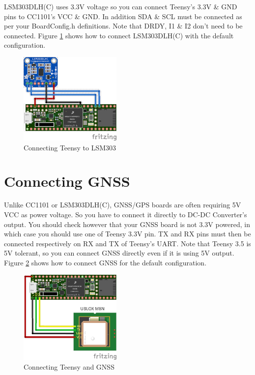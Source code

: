 \documentclass{report}
\begin{document}
LSM303DLH(C) uses 3.3V voltage so you can connect Teensy's 3.3V \& GND pins to CC1101's VCC \& GND. In addition SDA \& SCL must be connected as per your BoardConfig.h definitions. Note that DRDY, I1 \& I2 don't need to be connected. Figure \ref{figure:lsm303} shows how to connect LSM303DLH(C) with the default configuration.

\begin{figure}[h]
	\centering
	\includegraphics[width=50mm]{MicronetToNMEA_LSM303.png}
	\caption{Connecting Teensy to LSM303}
	\label{figure:lsm303}
\end{figure}

\section{Connecting GNSS}

Unlike CC1101 or LSM303DLH(C), GNSS/GPS boards are often requiring 5V VCC as power voltage. So you have to connect it directly to DC-DC Converter's output. You should check however that your GNSS board is not 3.3V powered, in which case you should use one of Teensy 3.3V pin.
TX and RX pins must then be connected respectively on RX and TX of Teensy's UART. Note that Teensy 3.5 is 5V tolerant, so you can connect GNSS directly even if it is using 5V output. Figure \ref{figure:gnss} shows how to connect GNSS for the default configuration.

\begin{figure}[h]
	\centering
	\includegraphics[width=50mm]{MicronetToNMEA_GNSS.png}
	\caption{Connecting Teensy and GNSS}
	\label{figure:gnss}
\end{figure}
\end{document}
